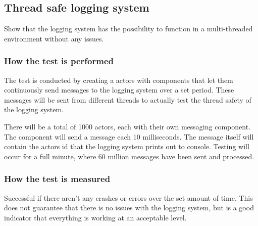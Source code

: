 \subsection{Thread safe logging system}
Show that the logging system has the possibility to function in a multi-threaded environment without any issues.

\subsubsection*{How the test is performed}
The test is conducted by creating a actors with components that let them continuously send messages to the logging system over a set period. These messages will be sent from different threads to actually test the thread safety of the logging system.

There will be a total of 1000 actors, each with their own messaging component.
The component will send a message each 10 milliseconds.
The message itself will contain the actors id that the logging system prints out to console.
Testing will occur for a full minute, where 60 million messages have been sent and processed.

\subsubsection*{How the test is measured}
Successful if there aren't any crashes or errors over the set amount of time. 
This does not guarantee that there is no issues with the logging system, but is a good indicator that everything is working at an acceptable level.
